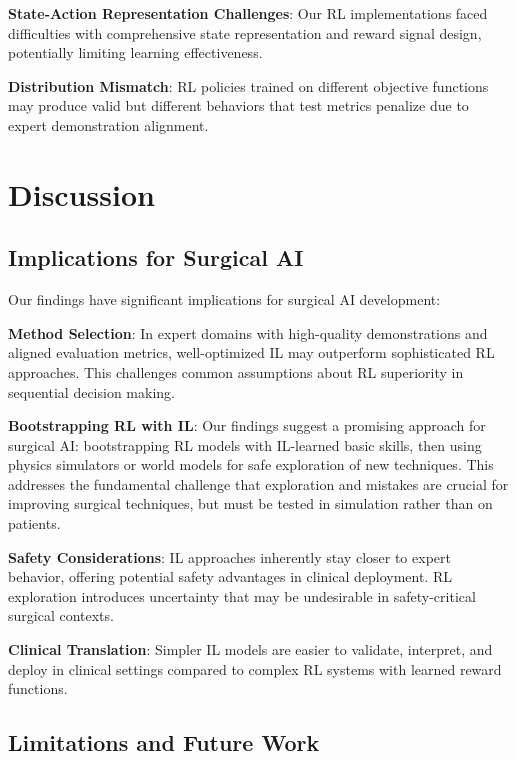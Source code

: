\documentclass[runningheads]{llncs}
\begin{document}
\textbf{State-Action Representation Challenges}: Our RL implementations faced difficulties with comprehensive state representation and reward signal design, potentially limiting learning effectiveness.

\textbf{Distribution Mismatch}: RL policies trained on different objective functions may produce valid but different behaviors that test metrics penalize due to expert demonstration alignment.

\section{Discussion}

\subsection{Implications for Surgical AI}

Our findings have significant implications for surgical AI development:

\textbf{Method Selection}: In expert domains with high-quality demonstrations and aligned evaluation metrics, well-optimized IL may outperform sophisticated RL approaches. This challenges common assumptions about RL superiority in sequential decision making.

\textbf{Bootstrapping RL with IL}: Our findings suggest a promising approach for surgical AI: bootstrapping RL models with IL-learned basic skills, then using physics simulators or world models for safe exploration of new techniques. This addresses the fundamental challenge that exploration and mistakes are crucial for improving surgical techniques, but must be tested in simulation rather than on patients.

\textbf{Safety Considerations}: IL approaches inherently stay closer to expert behavior, offering potential safety advantages in clinical deployment. RL exploration introduces uncertainty that may be undesirable in safety-critical surgical contexts.

\textbf{Clinical Translation}: Simpler IL models are easier to validate, interpret, and deploy in clinical settings compared to complex RL systems with learned reward functions.

\subsection{Limitations and Future Work}
\end{document}
